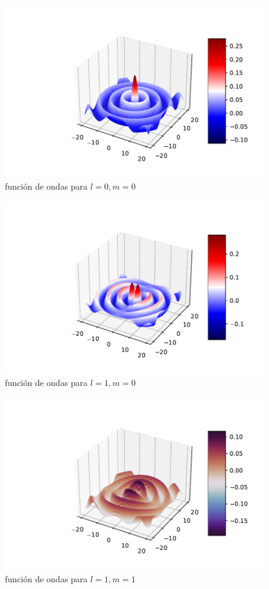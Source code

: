 \documentclass[12pt]{article}
\begin{document}
\begin{figure}[h!] \centering
\includegraphics[scale=1]{funcionesbessel0.pdf}
\caption{función de ondas para $l=0,m=0$}
\label{Fig:funcionesbessel0}
\end{figure}


\begin{figure}[h!] \centering
\includegraphics[scale=1]{funcionesbessel1.pdf}
\caption{función de ondas para $l=1,m=0$}
\label{Fig:funcionesbessel1}
\end{figure}

\begin{figure}[h!] \centering
\includegraphics[scale=1]{funcionesbessel1-1.pdf}
\caption{función de ondas para $l=1,m=1$}
\label{Fig:funcionesbessel1-1}
\end{figure}
\end{document}
